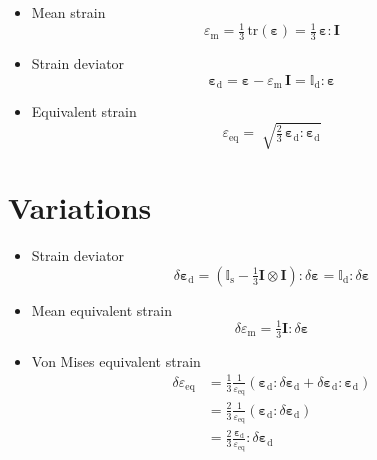 \documentclass{goose-article}
\begin{document}
\begin{itemize}
%
\item Mean strain
\begin{equation}
  \varepsilon_\mathrm{m}
  = \tfrac{1}{3} \, \mathrm{tr} ( \bm{\varepsilon} )
  = \tfrac{1}{3} \, \bm{\varepsilon} : \bm{I}
\end{equation}
%
\item Strain deviator
\begin{equation}
  \bm{\varepsilon}_\mathrm{d}
  = \bm{\varepsilon} - \varepsilon_\mathrm{m} \, \bm{I}
  = \mathbb{I}_\mathrm{d} : \bm{\varepsilon}
\end{equation}
%
\item Equivalent strain
\begin{equation}
  \varepsilon_\mathrm{eq}
  = \; \sqrt{
    \tfrac{2}{3} \, \bm{\varepsilon}_\mathrm{d} : \bm{\varepsilon}_\mathrm{d}
  }
\end{equation}
%
\end{itemize}

\section{Variations}
\label{sec:ap:variations}

\begin{itemize}
%
\item Strain deviator
\begin{equation}
  \delta \bm{\varepsilon}_\mathrm{d}
  = \left( \mathbb{I}_\mathrm{s} - \tfrac{1}{3} \bm{I} \otimes \bm{I} \right) :
    \delta \bm{\varepsilon}
  = \mathbb{I}_\mathrm{d} : \delta \bm{\varepsilon}
\end{equation}
%
\item Mean equivalent strain
\begin{equation}
  \delta \varepsilon_\mathrm{m}
  = \tfrac{1}{3} \bm{I} : \delta \bm{\varepsilon}
\end{equation}
%
\item Von Mises equivalent strain
\begin{align}
  \delta \varepsilon_\mathrm{eq}
  &= \frac{1}{3} \frac{1}{\varepsilon_\mathrm{eq}}
     \left( \bm{\varepsilon}_\mathrm{d} : \delta \bm{\varepsilon}_\mathrm{d} +
     \delta \bm{\varepsilon}_\mathrm{d} : \bm{\varepsilon}_\mathrm{d} \right) \\
  &= \frac{2}{3} \frac{1}{\varepsilon_\mathrm{eq}}
     \left( \bm{\varepsilon}_\mathrm{d} : \delta \bm{\varepsilon}_\mathrm{d} \right) \\
  &= \frac{2}{3} \frac{\bm{\varepsilon}_\mathrm{d}}{\varepsilon_\mathrm{eq}} :
     \delta \bm{\varepsilon}_\mathrm{d}
\end{align}
%
\end{itemize}
\end{document}
